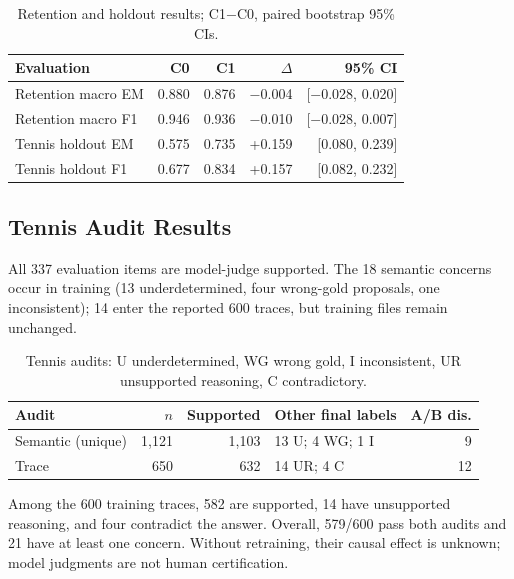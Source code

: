 \documentclass[conference]{IEEEtran}
\begin{document}
\begin{table}[t]
\centering
\caption{Retention and holdout results; C1$-$C0, paired bootstrap 95\% CIs.}
\label{tab:retention-final}
\setlength{\tabcolsep}{2.8pt}
{\footnotesize
\begin{tabular}{lrrrr}
\toprule
\textbf{Evaluation} & \textbf{C0} & \textbf{C1} & \textbf{$\Delta$} & \textbf{95\% CI} \\
\midrule
Retention macro EM & 0.880 & 0.876 & $-$0.004 & [$-$0.028, 0.020] \\
Retention macro F1 & 0.946 & 0.936 & $-$0.010 & [$-$0.028, 0.007] \\
\rowcolor{gray!18}
Tennis holdout EM & 0.575 & 0.735 & +0.159 & [0.080, 0.239] \\
\rowcolor{gray!18}
Tennis holdout F1 & 0.677 & 0.834 & +0.157 & [0.082, 0.232] \\
\bottomrule
\end{tabular}
}
\end{table}

\subsection{Tennis Audit Results}

All 337 evaluation items are model-judge supported. The 18 semantic concerns occur in training (13 underdetermined, four wrong-gold proposals, one inconsistent); 14 enter the reported 600 traces, but training files remain unchanged.

\begin{table}[t]
\centering
\caption{Tennis audits: U underdetermined, WG wrong gold, I inconsistent, UR unsupported reasoning, C contradictory.}
\label{tab:tennis-audits}
\setlength{\tabcolsep}{2.8pt}
{\footnotesize
\begin{tabular}{lrrlr}
\toprule
\textbf{Audit} & \textbf{$n$} & \textbf{Supported} & \textbf{Other final labels} & \textbf{A/B dis.} \\
\midrule
Semantic (unique) & 1{,}121 & 1{,}103 & 13 U; 4 WG; 1 I & 9 \\
Trace & 650 & 632 & 14 UR; 4 C & 12 \\
\bottomrule
\end{tabular}
}
\end{table}

Among the 600 training traces, 582 are supported, 14 have unsupported reasoning, and four contradict the answer. Overall, 579/600 pass both audits and 21 have at least one concern. Without retraining, their causal effect is unknown; model judgments are not human certification.
\end{document}
